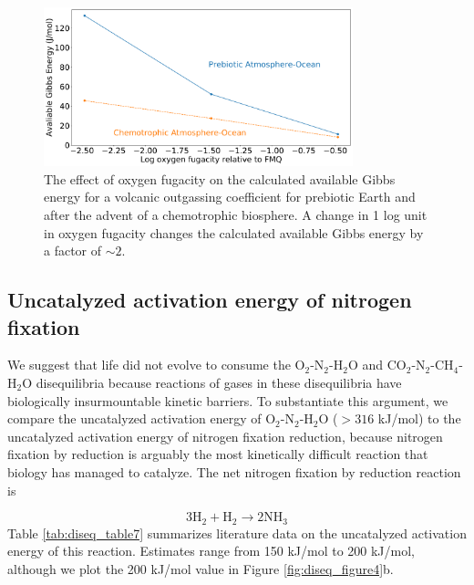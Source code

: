 \begin{figure}
  \centering
  \includegraphics[width=0.8\textwidth]{tex/2diseq/Figure9.pdf}
  \caption{The effect of oxygen fugacity on the calculated available Gibbs energy for a volcanic outgassing coefficient for prebiotic Earth and after the advent of a chemotrophic biosphere. A change in 1 log unit in oxygen fugacity changes the calculated available Gibbs energy by a factor of $\sim 2$. }
  \label{fig:diseq_figure9}
\end{figure}

\subsection{Uncatalyzed activation energy of nitrogen fixation} \label{sec:diseq_c}

We suggest that life did not evolve to consume the O$_2$-N$_2$-H$_2$O and CO$_2$-N$_2$-CH$_4$-H$_2$O disequilibria because reactions of gases in these disequilibria have biologically insurmountable kinetic barriers. To substantiate this argument, we compare the uncatalyzed activation energy of O$_2$-N$_2$-H$_2$O ($>316$ kJ/mol) to the uncatalyzed activation energy of nitrogen fixation reduction, because nitrogen fixation by reduction is arguably the most kinetically difficult reaction that biology has managed to catalyze. The net nitrogen fixation by reduction reaction is

\begin{equation}
  3 \mathrm{H_2} + \mathrm{H_2} \rightarrow 2 \mathrm{NH_3}
\end{equation}
Table \ref{tab:diseq_table7} summarizes literature data on the uncatalyzed activation energy of this reaction. Estimates range from 150 kJ/mol to 200 kJ/mol, although we plot the 200 kJ/mol value in Figure \ref{fig:diseq_figure4}b. 

